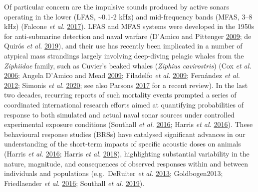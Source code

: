 \documentclass[
]{article}
\begin{document}
Of particular concern are the impulsive sounds produced by active sonars operating in the lower (LFAS, \textasciitilde0.1-2 kHz) and mid-frequency bands (MFAS, 3--8 kHz) (Falcone \emph{et al.} \protect\hyperlink{ref-Falcone2017}{2017}). LFAS and MFAS systems were developed in the 1950s for anti-submarine detection and naval warfare (D'Amico and Pittenger \protect\hyperlink{ref-Damico2009}{2009}; de Quirós \emph{et al.} \protect\hyperlink{ref-deQuiros2019}{2019}), and their use has recently been implicated in a number of atypical mass strandings largely involving deep-diving pelagic whales from the \emph{Ziphiidae} family, such as Cuvier's beaked whales (\emph{Ziphius cavirostris}) (Cox \emph{et al.} \protect\hyperlink{ref-Cox2006}{2006}; Angela D'Amico and Mead \protect\hyperlink{ref-Damico2009b}{2009}; Filadelfo \emph{et al.} \protect\hyperlink{ref-Filadelfo2009}{2009}; Fernández \emph{et al.} \protect\hyperlink{ref-Fernandez2012}{2012}; Simonis \emph{et al.} \protect\hyperlink{ref-Simonis2020}{2020}; see also Parsons \protect\hyperlink{ref-Parsons2017}{2017} for a recent review). In the last two decades, recurring reports of such mortality events prompted a series of coordinated international research efforts aimed at quantifying probabilities of response to both simulated and actual naval sonar sources under controlled experimental exposure conditions (Southall \emph{et al.} \protect\hyperlink{ref-Southall2016}{2016}; Harris \emph{et al.} \protect\hyperlink{ref-Harris2016}{2016}). These behavioural response studies (BRSs) have catalysed significant advances in our understanding of the short-term impacts of specific acoustic doses on animals (Harris \emph{et al.} \protect\hyperlink{ref-Harris2016}{2016}; Harris \emph{et al.} \protect\hyperlink{ref-Harris2018}{2018}), highlighting substantial variability in the nature, magnitude, and consequences of observed responses within and between individuals and populations (e.g.~DeRuiter \emph{et al.} \protect\hyperlink{ref-DeRuiter2013}{2013}; Goldbogen2013; Friedlaender \emph{et al.} \protect\hyperlink{ref-Friedlaender2016}{2016}; Southall \emph{et al.} \protect\hyperlink{ref-Southall2019}{2019}).
\end{document}
